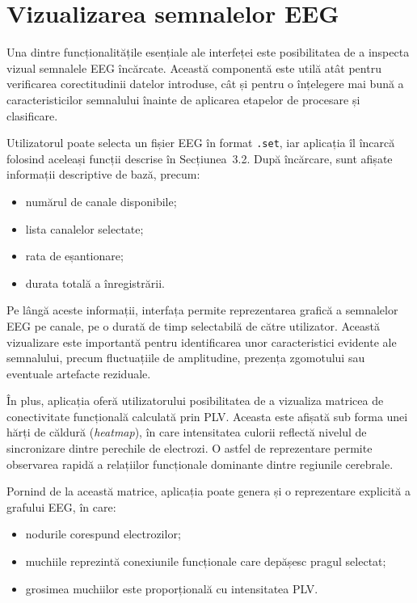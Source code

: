 \documentclass[12pt,a4paper]{report}
\theoremstyle{definition}
\theoremstyle{remark}
\begin{document}
\section{Vizualizarea semnalelor EEG}

Una dintre funcționalitățile esențiale ale interfeței este posibilitatea de a inspecta vizual semnalele EEG încărcate. Această componentă este utilă atât pentru verificarea corectitudinii datelor introduse, cât și pentru o înțelegere mai bună a caracteristicilor semnalului înainte de aplicarea etapelor de procesare și clasificare.

Utilizatorul poate selecta un fișier EEG în format \texttt{.set}, iar aplicația îl încarcă folosind aceleași funcții descrise în Secțiunea~3.2. După încărcare, sunt afișate informații descriptive de bază, precum:
\begin{itemize}
    \item numărul de canale disponibile;
    \item lista canalelor selectate;
    \item rata de eșantionare;
    \item durata totală a înregistrării.
\end{itemize}

Pe lângă aceste informații, interfața permite reprezentarea grafică a semnalelor EEG pe canale, pe o durată de timp selectabilă de către utilizator. Această vizualizare este importantă pentru identificarea unor caracteristici evidente ale semnalului, precum fluctuațiile de amplitudine, prezența zgomotului sau eventuale artefacte reziduale.

În plus, aplicația oferă utilizatorului posibilitatea de a vizualiza matricea de conectivitate funcțională calculată prin PLV. Aceasta este afișată sub forma unei hărți de căldură (\textit{heatmap}), în care intensitatea culorii reflectă nivelul de sincronizare dintre perechile de electrozi. O astfel de reprezentare permite observarea rapidă a relațiilor funcționale dominante dintre regiunile cerebrale.

Pornind de la această matrice, aplicația poate genera și o reprezentare explicită a grafului EEG, în care:
\begin{itemize}
    \item nodurile corespund electrozilor;
    \item muchiile reprezintă conexiunile funcționale care depășesc pragul selectat;
    \item grosimea muchiilor este proporțională cu intensitatea PLV.
\end{itemize}
\end{document}
